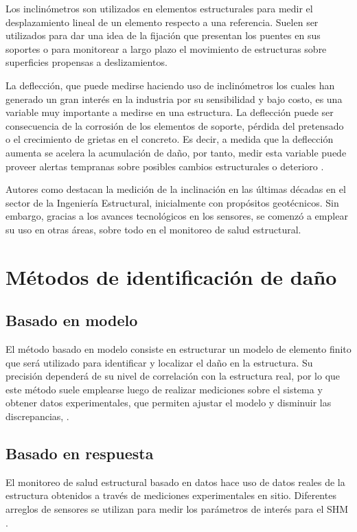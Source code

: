 \begin{itemize}
        Los inclinómetros son utilizados en elementos estructurales para medir el desplazamiento lineal de un elemento respecto a una referencia. Suelen ser utilizados para dar una idea de la fijación que presentan los puentes en sus soportes o para monitorear a largo plazo el movimiento de estructuras sobre superficies propensas a deslizamientos.

        La deflección, que puede medirse haciendo uso de inclinómetros los cuales han generado un gran interés en la industria por su sensibilidad y bajo costo, es una variable muy importante a medirse en una estructura. La deflección puede ser consecuencia de la corrosión de los elementos de soporte, pérdida del pretensado o el crecimiento de grietas en el concreto. Es decir, a medida que la deflección aumenta se acelera la acumulación de daño, por tanto, medir esta variable puede proveer alertas tempranas sobre posibles cambios estructurales o deterioro \citep{zhang2017bridge}.

        Autores como \citet{komarizadehasl2022development} destacan la medición de la inclinación en las últimas décadas en el sector de la Ingeniería Estructural, inicialmente con propósitos geotécnicos. Sin embargo, gracias a los avances tecnológicos en los sensores, se comenzó a emplear su uso en otras áreas, sobre todo en el monitoreo de salud estructural.

    \end{itemize}

\section{Métodos de identificación de daño}

    \subsection{Basado en modelo} El método basado en modelo consiste en estructurar un modelo de elemento finito que será utilizado para identificar y localizar el daño en la estructura. Su precisión dependerá de su nivel de correlación con la estructura real, por lo que este método suele emplearse luego de realizar mediciones sobre el sistema y obtener datos experimentales, que permiten ajustar el modelo y disminuir las discrepancias, \citep{garcia2023review}.

    \subsection{Basado en respuesta} El monitoreo de salud estructural basado en datos hace uso de datos reales de la estructura obtenidos a través de mediciones experimentales en sitio. Diferentes arreglos de sensores se utilizan para medir los parámetros de interés para el SHM \citep{mohamed2014}.


